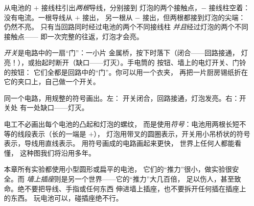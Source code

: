 \begin{example}[为什么要两端都接？]\label{ex:g3:first-electric-circuit:bothends}
从电池的 $+$ 接线柱引出\emph{两根}导线，分别接到
灯泡的两个接触点，$-$ 接线柱空着：没有电流。一根导线从 $+$ 接出，
另一根从 $-$ 接出，但两根都接到灯泡的尖端：仍然不亮。
只有当回路同时经过电池的两个不同接线柱
\emph{并且}经过灯泡的两个不同接触点——
即一次完整的往返，灯泡才会亮。
\end{example}

\begin{example}[开关]\label{ex:g3:first-electric-circuit:switch}
\emph{开关}是电路中的一扇“门”：一小片
金属桥，按下时落下（闭合——回路接通，
灯亮！），或抬起时断开（缺口——灯灭）。手电筒的
按钮、墙上的电灯开关、门铃的按钮：
它们全都是回路中的“门”。你可以用一个衣夹，
再把一片厨房锡纸折在它的夹口上，自己做一个开关。
\end{example}

\begin{omfigure}

{\small 同一个电路，用规整的符号画出。左：
开关闭合，回路接通，灯泡发亮。右：开关处
有一处缺口——灯灭。}
\end{omfigure}

\begin{remark}[规整的画法]\label{rem:g3:first-electric-circuit:symbols}
电工不必画出每个电池的凸起和灯泡的螺纹，
而是使用\emph{符号}：电池用两根长短不等的线段表示（长的一端是 $+$），
灯泡用带叉的圆圈表示，开关用小吊桥状的符号表示，导线用直线表示。
用符号画成的电路画起来更快，
世界上任何人都能看懂，
这种图我们将沿用多年。
\end{remark}

\begin{remark}\label{rem:g3:first-electric-circuit:safety}
本章所有实验都使用小型圆形或扁平的电池，
它们的“推力”很小，做实验很安全。而
\emph{墙上插座}则是另一个世界——它的“推力”大几百倍，
足以伤人，甚至致命。绝不要把导线、手指或任何东西
伸进墙上插座，也不要拆开任何插在插座上的东西。
玩电池可以，碰插座绝不行。
\end{remark}

